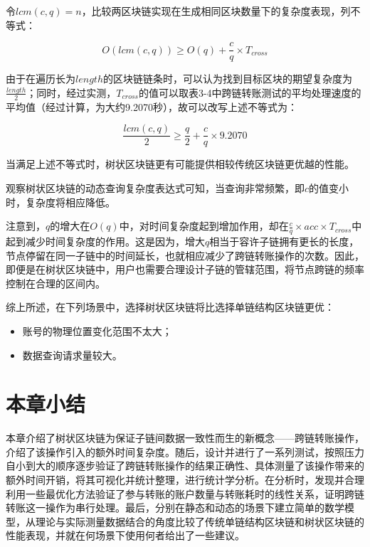 令$lcm(c, q) = n$，比较两区块链实现在生成相同区块数量下的复杂度表现，列不等式：

$$
    O(lcm(c, q)) \geq O(q) + \frac{c}{q} \times T_{cross}
$$

由于在遍历长为$length$的区块链链条时，可以认为找到目标区块的期望复杂度为$\frac{length}{2}$；同时，经过实测，$T_{cross}$的值可以取表3-4中跨链转账测试的平均处理速度的平均值（经过计算，为大约9.2070秒），故可以改写上述不等式为：

$$
    \frac{lcm(c, q)}{2} \geq \frac{q}{2} + \frac{c}{q} \times 9.2070
$$

当满足上述不等式时，树状区块链更有可能提供相较传统区块链更优越的性能。

观察树状区块链的动态查询复杂度表达式可知，当查询非常频繁，即$c$的值变小时，复杂度将相应降低。

注意到，$q$的增大在$O(q)$中，对时间复杂度起到增加作用，却在$\frac{c}{q} \times acc \times T_{cross}$中起到减少时间复杂度的作用。这是因为，增大$q$相当于容许子链拥有更长的长度，节点停留在同一子链中的时间延长，也就相应减少了跨链转账操作的次数。因此，即便是在树状区块链中，用户也需要合理设计子链的管辖范围，将节点跨链的频率控制在合理的区间内。

综上所述，在下列场景中，选择树状区块链将比选择单链结构区块链更优：

\begin{itemize}
    \item 账号的物理位置变化范围不太大；
    \item 数据查询请求量较大。
\end{itemize}

\section{本章小结}

本章介绍了树状区块链为保证子链间数据一致性而生的新概念——跨链转账操作，介绍了该操作引入的额外时间复杂度。随后，设计并进行了一系列测试，按照压力自小到大的顺序逐步验证了跨链转账操作的结果正确性、具体测量了该操作带来的额外时间开销，将其可视化并统计整理，进行统计学分析。在分析时，发现并合理利用一些最优化方法验证了参与转账的账户数量与转账耗时的线性关系，证明跨链转账这一操作为串行处理。最后，分别在静态和动态的场景下建立简单的数学模型，从理论与实际测量数据结合的角度比较了传统单链结构区块链和树状区块链的性能表现，并就在何场景下使用何者给出了一些建议。
